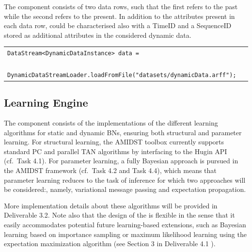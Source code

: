 The  component consists of two data rows, such that the first refers to the past while the second refers to the present. In addition to the attributes present in each data row,  could be characterised also with a TimeID and a SequenceID stored as additional attributes in the considered dynamic data.

\vspace{-0.1in}
\begin{table}[H]
\begin{tabular}{l} \\ \hline
        \texttt{DataStream<DynamicDataInstance> data = }\\
        \texttt{~~~~ DynamicDataStreamLoader.loadFromFile("datasets/dynamicData.arff");}\\\hline 
\end{tabular}
\end{table}


\subsection{Learning Engine}

The  component consists of the implementations of the different learning algorithms for static and dynamic BNs, ensuring both structural and parameter learning. For structural learning, the AMIDST toolbox currently supports standard PC and parallel TAN algorithms by interfacing to the Hugin API (cf.\ Task 4.1). For parameter learning, a fully Bayesian approach is pursued in the AMIDST framework (cf.\ Task 4.2 and Task 4.4), which means that parameter learning reduces to the task of inference for which two approaches will be considered:, namely, variational message passing and expectation propagation. 

More implementation details about these algorithms will be provided in Deliverable 3.2. Note also that the design of the  is flexible in the sense that it easily accommodates potential future learning-based extensions, such as Bayesian learning based on importance sampling or maximum likelihood learning using the expectation maximization algorithm (see Section 3 in Deliverable 4.1 \cite{Deliverable4.1}). 
 
